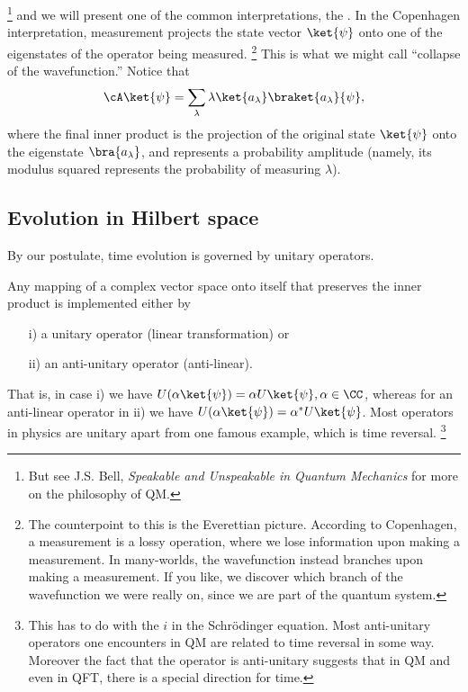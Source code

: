     \footnote{But see J.S. Bell, \emph{Speakable and Unspeakable in Quantum Mechanics} for more on the philosophy of QM.}
and we will present one of the common interpretations, the . In the Copenhagen interpretation, measurement projects the state vector $\ket{\psi}$ onto one of the eigenstates of the operator being measured.%
    \footnote{The counterpoint to this is the Everettian picture. According to Copenhagen, a measurement is a lossy operation, where we lose information upon making a measurement. In many-worlds, the wavefunction instead branches upon making a measurement. If you like, we discover which branch of the wavefunction we were really on, since we are part of the quantum system.}
This is what we might call ``collapse of the wavefunction.'' Notice that
\begin{equation}
    \cA \ket{\psi} = \sum_\lambda \lambda \ket{a_\lambda} \braket{a_\lambda}{\psi},
\end{equation}
where the final inner product is the projection of the original state $\ket{\psi}$ onto the eigenstate $\bra{a_\lambda}$, and represents a probability amplitude (namely, its modulus squared represents the probability of measuring $\lambda$).

\subsection*{Evolution in Hilbert space}
By our postulate, time evolution is governed by unitary operators.
\begin{thm}[Wigner]
    Any mapping of a complex vector space onto itself that preserves the inner product is implemented either by
    \begin{enumerate}
        \item[i)] a unitary operator (linear transformation) or
        \item[ii)] an anti-unitary operator (anti-linear).
    \end{enumerate}
\end{thm}
That is, in case i) we have $U(\alpha\ket{\psi})= \alpha U\ket{\psi}, \alpha \in \CC$, whereas for an anti-linear operator in ii) we have $U(\alpha\ket{\psi})= \alpha^* U\ket{\psi}$. Most operators in physics are unitary apart from one famous example, which is time reversal.%
    \footnote{This has to do with the $i$ in the Schr\"odinger equation. Most anti-unitary operators one encounters in QM are related to time reversal in some way. Moreover the fact that the operator is anti-unitary suggests that in QM and even in QFT, there is a special direction for time.}

